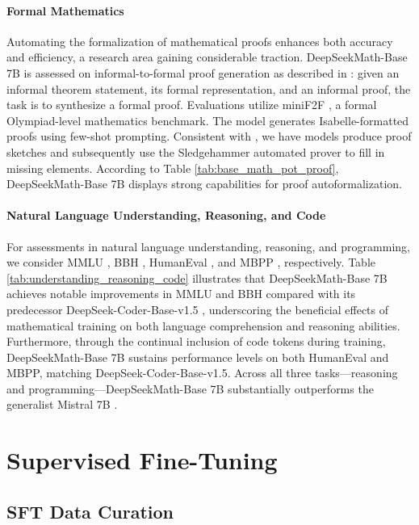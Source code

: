 \paragraph{Formal Mathematics}

Automating the formalization of mathematical proofs enhances both accuracy and efficiency, a research area gaining considerable traction. DeepSeekMath-Base 7B is assessed on informal-to-formal proof generation as described in \citep{dsp_proof}: given an informal theorem statement, its formal representation, and an informal proof, the task is to synthesize a formal proof. Evaluations utilize miniF2F \citep{minif2f}, a formal Olympiad-level mathematics benchmark. The model generates Isabelle-formatted proofs using few-shot prompting. Consistent with \cite{dsp_proof}, we have models produce proof sketches and subsequently use the Sledgehammer automated prover \citep{sledgehammer} to fill in missing elements. According to Table \ref{tab:base_math_pot_proof}, DeepSeekMath-Base 7B displays strong capabilities for proof autoformalization.

\paragraph{Natural Language Understanding, Reasoning, and Code}

For assessments in natural language understanding, reasoning, and programming, we consider MMLU \citep{mmlu}, BBH \citep{bbh}, HumanEval \citep{codex}, and MBPP \citep{mbpp}, respectively. Table \ref{tab:understanding_reasoning_code} illustrates that DeepSeekMath-Base 7B achieves notable improvements in MMLU and BBH compared with its predecessor DeepSeek-Coder-Base-v1.5 \citep{deepseek-coder}, underscoring the beneficial effects of mathematical training on both language comprehension and reasoning abilities. Furthermore, through the continual inclusion of code tokens during training, DeepSeekMath-Base 7B sustains performance levels on both HumanEval and MBPP, matching DeepSeek-Coder-Base-v1.5. Across all three tasks—reasoning and programming—DeepSeekMath-Base 7B substantially outperforms the generalist Mistral 7B \citep{mistral}.

\section{Supervised Fine-Tuning}

\subsection{SFT Data Curation}


